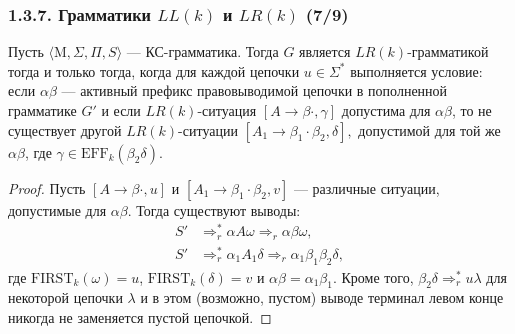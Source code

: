 \begin{frame}
\frametitle{1.3.7. Грамматики $LL(k)$ и $LR(k)$ (7/9)}
\begin{theorem}
Пусть $\langle \mathrm{M}, \Sigma, \Pi, S \rangle$ --- КС-грамматика.  
Тогда $G$ является $LR(k)$-грамматикой тогда и только тогда, когда для каждой цепочки $u \in \Sigma^*$ выполняется условие:
если $\alpha \beta$ --- активный префикс правовыводимой цепочки в пополненной грамматике $G'$ и если $LR(k)$-ситуация $[A \to \beta \cdot, \gamma]$ допустима для $\alpha \beta$,
то не существует другой $LR(k)$-ситуации 
$[A_1 \to \beta_1 \cdot \beta_2, \delta],$
допустимой для той же $\alpha \beta$, где $\gamma \in \mathrm{EFF}_k(\beta_2 \delta)$.
\end{theorem}
\begin{proof}
Пусть $[A \to \beta \cdot, u]$ и $[A_1 \to \beta_1 \cdot \beta_2, v]$ —
различные ситуации, допустимые для $\alpha \beta$.  
Тогда существуют выводы:
\[
\begin{aligned}
S' &\Rightarrow_r^* \alpha A \omega \Rightarrow_r \alpha \beta \omega,\\
S' &\Rightarrow_r^* \alpha_1 A_1 \delta \Rightarrow_r \alpha_1 \beta_1 \beta_2 \delta,
\end{aligned}
\]
где $\mathrm{FIRST}_k(\omega)=u$, $\mathrm{FIRST}_k(\delta)=v$ и $\alpha \beta = \alpha_1 \beta_1$. Кроме того, $\beta_2 \delta \Rightarrow^*_r u \lambda$ для некоторой цепочки $\lambda$ и в этом (возможно, пустом) выводе терминал левом конце никогда не заменяется пустой цепочкой. 
\end{proof}
\end{frame}

